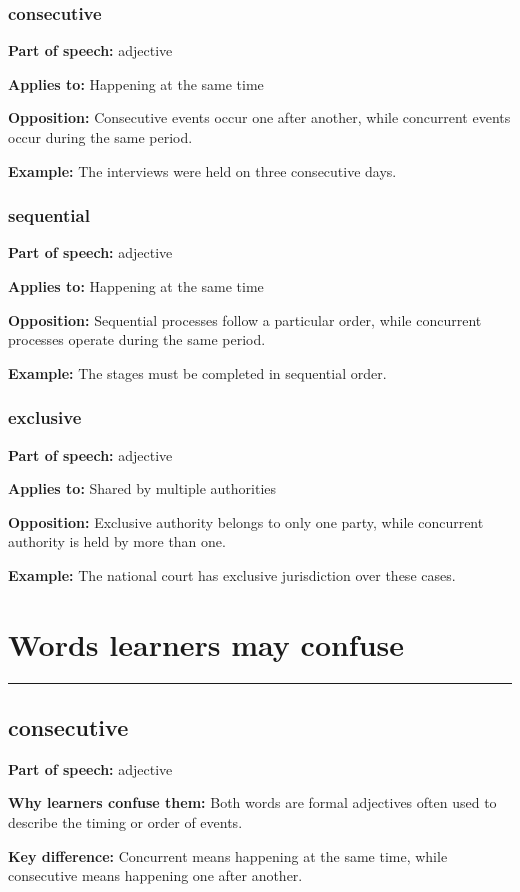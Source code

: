 \documentclass[11pt]{article}
\newcommand{\sectionrule}{\par\vspace{-0.5em}\noindent\textcolor{Accent}{\rule{\linewidth}{0.6pt}}\par}
\begin{document}
\subsubsection{consecutive}
\textbf{Part of speech:} adjective

\textbf{Applies to:} Happening at the same time

\textbf{Opposition:} Consecutive events occur one after another, while concurrent events occur during the same period.

\textbf{Example:} The interviews were held on three consecutive days.

\subsubsection{sequential}
\textbf{Part of speech:} adjective

\textbf{Applies to:} Happening at the same time

\textbf{Opposition:} Sequential processes follow a particular order, while concurrent processes operate during the same period.

\textbf{Example:} The stages must be completed in sequential order.

\subsubsection{exclusive}
\textbf{Part of speech:} adjective

\textbf{Applies to:} Shared by multiple authorities

\textbf{Opposition:} Exclusive authority belongs to only one party, while concurrent authority is held by more than one.

\textbf{Example:} The national court has exclusive jurisdiction over these cases.

\section{Words learners may confuse}
\sectionrule
\subsection{consecutive}
\textbf{Part of speech:} adjective

\textbf{Why learners confuse them:} Both words are formal adjectives often used to describe the timing or order of events.

\textbf{Key difference:} Concurrent means happening at the same time, while consecutive means happening one after another.
\end{document}

